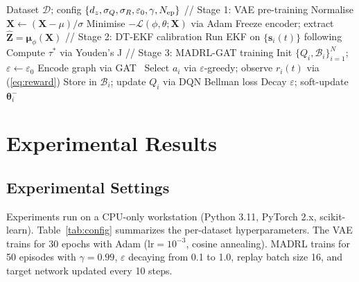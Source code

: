 \documentclass[conference]{IEEEtran}
\begin{document}
\begin{algorithm}[H]
\caption{Proposed Framework: Training Procedure}
\label{alg:main}
\begin{algorithmic}[1]
\REQUIRE Dataset $\mathcal{D}$; config $\{d_z,\sigma_Q,\sigma_R,\varepsilon_0,\gamma,N_{\rm ep}\}$
\STATE // Stage 1: VAE pre-training
\STATE Normalise $\mathbf{X}\leftarrow(\mathbf{X}-\mu)/\sigma$
  \STATE Minimise $-\mathcal{L}(\phi,\theta;\mathbf{X})$ via Adam
\ENDFOR
\STATE Freeze encoder; extract $\hat{\mathbf{Z}}=\bm{\mu}_\phi(\mathbf{X})$
\STATE // Stage 2: DT-EKF calibration
\STATE Run EKF on $\{\mathbf{s}_i(t)\}$ following~\cite{ref_ekf}
\STATE Compute $\tau^*$ via Youden's J
\STATE // Stage 3: MADRL-GAT training
\STATE Init $\{Q_i,\mathcal{B}_i\}_{i=1}^N$; $\varepsilon\leftarrow\varepsilon_0$
    \STATE Encode graph via GAT~\cite{ref_gat_comm}
    \STATE Select $a_i$ via $\varepsilon$-greedy; observe $r_i(t)$ via (\ref{eq:reward})
    \STATE Store in $\mathcal{B}_i$; update $Q_i$ via DQN Bellman loss
  \ENDFOR
  \STATE Decay $\varepsilon$; soft-update $\bm{\theta}_i^-$
\ENDFOR
\end{algorithmic}
\end{algorithm}

\section{Experimental Results}
\label{sec:experiments}

\subsection{Experimental Settings}

Experiments run on a CPU-only workstation (Python 3.11, PyTorch 2.x,
scikit-learn). Table~\ref{tab:config} summarizes the per-dataset
hyperparameters. The VAE trains for 30 epochs with Adam
($\mathrm{lr}=10^{-3}$, cosine annealing). MADRL trains for 50 episodes
with $\gamma=0.99$, $\varepsilon$ decaying from 0.1 to 1.0, replay
batch size 16, and target network updated every 10 steps.
\end{document}
